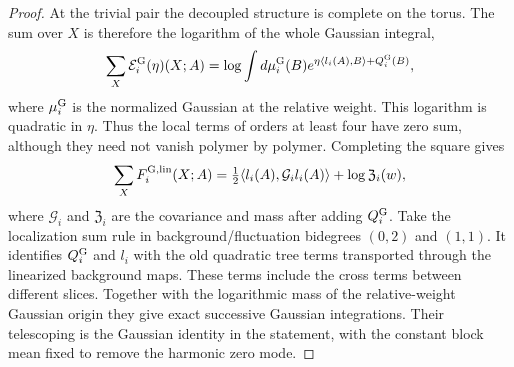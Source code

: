 \documentclass[11pt,letterpaper,reqno]{amsart}
\theoremstyle{definition}
\theoremstyle{remark}
\begin{document}
\begin{proof}
At the trivial pair the decoupled structure is complete on
the torus. The sum over $X$ is therefore the logarithm of the
whole Gaussian integral,
\[
 \sum_X\mathcal E_i^{\rm G}(\eta)(X;A)
   =\log\int d\mu_i^{\rm G}(B)
        e^{\eta\langle l_i(A),B\rangle+Q_i^{\rm G}(B)},
\]
where $\mu_i^{\rm G}$ is the normalized Gaussian at the
relative weight. This logarithm is quadratic in $\eta$.
Thus the local terms of orders at least four have zero sum,
although they need not vanish polymer by polymer. Completing
the square gives
\[
 \sum_XF_i^{\rm G,lin}(X;A)
   =\tfrac12\langle l_i(A),\mathcal G_i l_i(A)\rangle
                           +\log\mathfrak Z_i(w),
\]
where $\mathcal G_i$ and $\mathfrak Z_i$ are the covariance
and mass after adding $Q_i^{\rm G}$. Take the localization
sum rule in background/fluctuation bidegrees $(0,2)$ and
$(1,1)$. It identifies $Q_i^{\rm G}$ and $l_i$ with the old
quadratic tree terms transported through the linearized
background maps. These terms include the cross terms between
different slices. Together with the logarithmic mass of the
relative-weight Gaussian origin they give exact successive
Gaussian integrations. Their telescoping is the Gaussian
identity in the statement, with the constant block mean fixed
to remove the harmonic zero mode.


\end{proof}
\end{document}

